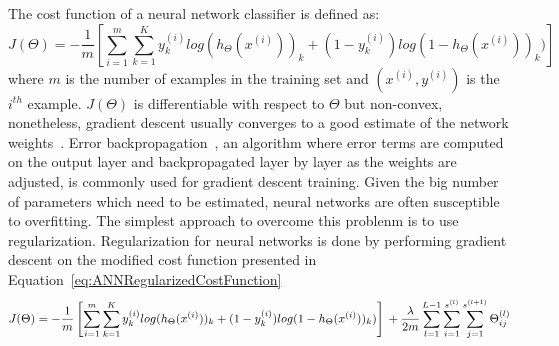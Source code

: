 The cost function of a neural network classifier is defined as:
\begin{equation}
	J(\Theta) = -\frac{1}{m} \left[\sum_{i=1}^m \sum_{k=1}^K y_k^{(i)}log(h_\Theta(x^{(i)}))_k + (1-y_k^{(i)})log(1-h_\Theta(x^{(i)}))_k)\right]
\end{equation}
where $m$ is the number of examples in the training set and $(x^{(i)},y^{(i)})$ is the $i^{th}$ example. $J(\Theta)$ is differentiable with respect to $\Theta$ but non-convex, nonetheless, gradient descent usually converges to a good estimate of the network weights~\cite{Ng2014}. Error backpropagation~\cite{Linnainmaa1970, Werbos1974}, an algorithm where error terms are computed on the output layer and backpropagated layer by layer as the weights are adjusted, is commonly used for gradient descent training. Given the big number of parameters which need to be estimated, neural networks are often susceptible to overfitting. The simplest approach to overcome this problenm is to use regularization. Regularization for neural networks is done by performing gradient descent on the modified cost function presented in Equation~\ref{eq:ANNRegularizedCostFunction}
\begin{equation}
	J(\Theta) = -\frac{1}{m} \left[\sum_{i=1}^m \sum_{k=1}^K y_k^{(i)}log(h_\Theta(x^{(i)}))_k + (1-y_k^{(i)})log(1-h_\Theta(x^{(i)}))_k)\right]\\+ \frac{\lambda}{2m}\sum_{l=1}^{L-1}\sum_{i=1}^{s^{(l)}}\sum_{j=1}^{s^{(l+1)}} \Theta^{(l)}_{ij}
	\label{eq:ANNRegularizedCostFunction}
\end{equation}
